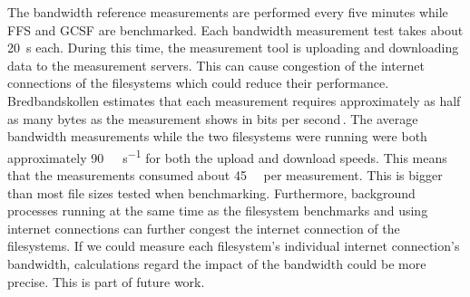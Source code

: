 The bandwidth reference measurements are performed every five minutes while \gls{FFS} and \gls{GCSF} are benchmarked. Each bandwidth measurement test takes about \SI[per-mode = symbol]{20}{\second} each. During this time, the measurement tool is uploading and downloading data to the measurement servers. This can cause congestion of the internet connections of the filesystems which could reduce their performance. Bredbandskollen estimates that each measurement requires approximately as half as many bytes as the measurement shows in bits per second\,\cite{internetstiftelsenMerOmBredbandskollen}. The average bandwidth measurements while the two filesystems were running were both approximately \SI[per-mode = symbol]{90}{\mega\bit\per\second} for both the upload and download speeds. This means that the measurements consumed about \SI[per-mode = symbol]{45}{\mega\byte} per measurement. This is bigger than most file sizes tested when benchmarking. Furthermore, background processes running at the same time as the filesystem benchmarks  and using internet connections can further congest the internet connection of the filesystems. If we could measure each filesystem's individual internet connection's bandwidth, calculations regard the impact of the bandwidth could be more precise. This is part of future work.



%
%
%
